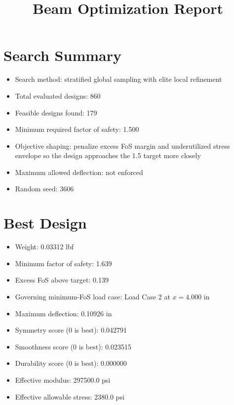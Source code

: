 \documentclass[11pt]{article}
\title{Beam Optimization Report}
\date{}
\begin{document}
\maketitle

\section*{Search Summary}
\begin{itemize}
\item Search method: stratified global sampling with elite local refinement
\item Total evaluated designs: 860
\item Feasible designs found: 179
\item Minimum required factor of safety: 1.500
\item Objective shaping: penalize excess FoS margin and underutilized stress envelope so the design approaches the 1.5 target more closely
\item Maximum allowed deflection: not enforced
\item Random seed: 3606
\end{itemize}

\section*{Best Design}
\begin{itemize}
\item Weight: 0.03312 lbf
\item Minimum factor of safety: 1.639
\item Excess FoS above target: 0.139
\item Governing minimum-FoS load case: Load Case 2 at $x=4.000$ in
\item Maximum deflection: 0.10926 in
\item Symmetry score (0 is best): 0.042791
\item Smoothness score (0 is best): 0.023515
\item Durability score (0 is best): 0.000000
\item Effective modulus: 297500.0 psi
\item Effective allowable stress: 2380.0 psi
\end{itemize}
\end{document}
